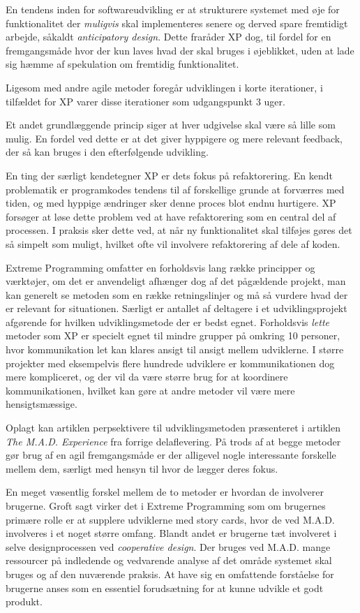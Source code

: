 \documentclass[11pt, a4paper]{article}
\begin{document}
En tendens inden for softwareudvikling er at strukturere systemet med øje for funktionalitet der \emph{muligvis} skal implementeres senere og derved spare fremtidigt arbejde, såkaldt \emph{anticipatory design}. Dette fraråder XP dog, til fordel for en fremgangsmåde hvor der kun laves hvad der skal bruges i øjeblikket, uden at lade sig hæmme af spekulation om fremtidig funktionalitet.

Ligesom med andre agile metoder foregår udviklingen i korte iterationer, i tilfældet for XP varer disse iterationer som udgangspunkt 3 uger. 

Et andet grundlæggende princip siger at hver udgivelse skal være så lille som mulig. En fordel ved dette er at det giver hyppigere og mere relevant feedback, der så kan bruges i den efterfølgende udvikling.

En ting der særligt kendetegner XP er dets fokus på refaktorering. En kendt problematik er programkodes tendens til af forskellige grunde at forværres med tiden, og med hyppige ændringer sker denne proces blot endnu hurtigere. XP forsøger at løse dette problem ved at have refaktorering som en central del af processen. I praksis sker dette ved, at når ny funktionalitet skal tilføjes gøres det så simpelt som muligt, hvilket ofte vil involvere refaktorering af dele af koden.

Extreme Programming omfatter en forholdsvis lang række principper og værktøjer, om det er anvendeligt afhænger dog af det pågældende projekt, man kan generelt se metoden som en række retningslinjer og må så vurdere hvad der er relevant for situationen. Særligt er antallet af deltagere i et udviklingsprojekt afgørende for hvilken udviklingsmetode der er bedst egnet. Forholdsvis \emph{lette} metoder som XP er specielt egnet til mindre grupper på omkring 10 personer, hvor kommunikation let kan klares ansigt til ansigt mellem udviklerne. I større projekter med eksempelvis flere hundrede udviklere er kommunikationen dog mere kompliceret, og der vil da være større brug for at koordinere kommunikationen, hvilket kan gøre at andre metoder vil være mere hensigtsmæssige.

Oplagt kan artiklen perpsektivere til udviklingsmetoden præsenteret i artiklen \emph{The M.A.D. Experience} fra forrige delaflevering. På trods af at begge metoder gør brug af en agil fremgangsmåde er der alligevel nogle interessante forskelle mellem dem, særligt med hensyn til hvor de lægger deres fokus. 

En meget væsentlig forskel mellem de to metoder er hvordan de involverer brugerne. Groft sagt virker det i Extreme Programming som om brugernes primære rolle er at supplere udviklerne med story cards, hvor de ved M.A.D. involveres i et noget større omfang. Blandt andet er brugerne tæt involveret i selve designprocessen ved \emph{cooperative design}. Der bruges ved M.A.D. mange ressourcer på indledende og vedvarende analyse af det område systemet skal bruges og af den nuværende praksis. At have sig en omfattende forståelse for brugerne anses som en essentiel forudsætning for at kunne udvikle et godt produkt.
\end{document}
